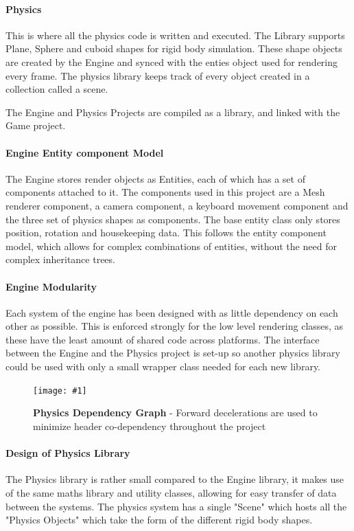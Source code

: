 \documentclass[conference]{acmsiggraph}
\newcommand{\figuremacroW}[4]{
	\begin{figure}[h] %
		\centering
		\texttt{[image: \#1]}
		\caption[#2]{\textbf{#2} - #3}
		\label{fig:#1}
	\end{figure}
}
\begin{document}
\paragraph{Physics}
This is where all the physics code is written and executed. The Library supports Plane, Sphere and cuboid shapes for rigid body simulation. These shape objects are created by the Engine and synced with the enties object used for rendering every frame. The physics library keeps track of every object created in a collection called a scene.

The Engine and Physics Projects are compiled as a library, and linked with the Game project.

\paragraph{Engine Entity component Model}
The Engine stores render objects as Entities, each of which has a set of components attached to it.
The components used in this project are a Mesh renderer component, a camera component, a keyboard movement component and the three set of physics shapes as components. The base entity class only stores  position, rotation and housekeeping data.
This follows the entity component model, which allows for complex combinations of entities, without the need for complex inheritance trees.

\paragraph{Engine Modularity}
Each system of the engine has been designed with as little dependency on each other as possible. This is enforced strongly for the low level rendering classes, as these have the least amount of shared code across platforms. The interface between the Engine and the Physics project is set-up so another physics library could be used with only a small wrapper class needed for each new library.

\figuremacroW
{physicsclasses}
{Physics Dependency Graph}
{Forward decelerations are used to minimize header co-dependency throughout the project}
{1.0}

\paragraph{Design of Physics Library}
The Physics library is rather small compared to the Engine library, it makes use of the same maths library and utility classes, allowing for easy transfer of data between the systems. The physics system has a single "Scene" which hosts all the "Physics Objects" which take the form of the different rigid body shapes.
\end{document}
